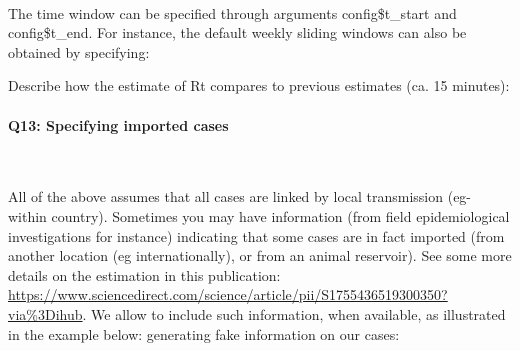 \documentclass[
  11pt,
]{article}
\newenvironment{Shaded}{\begin{snugshade}}{\end{snugshade}}
\newcommand{\AttributeTok}[1]{\textcolor[rgb]{0.77,0.63,0.00}{#1}}
\newcommand{\CommentTok}[1]{\textcolor[rgb]{0.56,0.35,0.01}{\textit{#1}}}
\newcommand{\DecValTok}[1]{\textcolor[rgb]{0.00,0.00,0.81}{#1}}
\newcommand{\FloatTok}[1]{\textcolor[rgb]{0.00,0.00,0.81}{#1}}
\newcommand{\FunctionTok}[1]{\textcolor[rgb]{0.00,0.00,0.00}{#1}}
\newcommand{\NormalTok}[1]{#1}
\newcommand{\OtherTok}[1]{\textcolor[rgb]{0.56,0.35,0.01}{#1}}
\newcommand{\SpecialCharTok}[1]{\textcolor[rgb]{0.00,0.00,0.00}{#1}}
\newcommand{\StringTok}[1]{\textcolor[rgb]{0.31,0.60,0.02}{#1}}
\begin{document}
~

The time window can be specified through arguments config\$t\_start and
config\$t\_end. For instance, the default weekly sliding windows can
also be obtained by specifying:

Describe how the estimate of Rt compares to previous estimates (ca. 15
minutes):

\begin{Shaded}
\end{Shaded}

\hypertarget{q13-specifying-imported-cases}{%
\paragraph{Q13: Specifying imported
cases}\label{q13-specifying-imported-cases}}

~

All of the above assumes that all cases are linked by local transmission
(eg- within country). Sometimes you may have information (from field
epidemiological investigations for instance) indicating that some cases
are in fact imported (from another location (eg internationally), or
from an animal reservoir). See some more details on the estimation in
this publication:
\url{https://www.sciencedirect.com/science/article/pii/S1755436519300350?via\%3Dihub}.
We allow to include such information, when available, as illustrated in
the example below: generating fake information on our cases:
\end{document}
